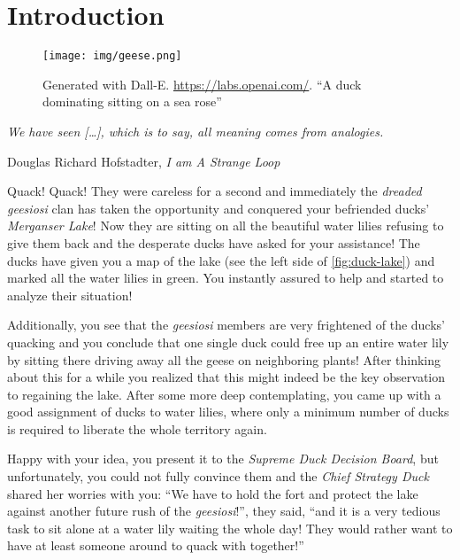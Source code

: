 \chapter{Introduction}\label{ch:introduction}

\vspace*{-50pt}

\begin{figure}[ht]
        \texttt{[image: img/geese.png]}
        \captionsetup{textformat=empty,labelformat=blank}
        \caption{Generated with Dall-E. \url{https://labs.openai.com/}. ``A duck dominating sitting on a sea rose''}
\end{figure}

\epigraph{\itshape We have seen [\ldots], which is to say, all meaning comes from analogies.}{Douglas Richard Hofstadter, \textit{I am A Strange Loop}}

Quack! Quack! They were careless for a second and immediately the \textit{dreaded geesiosi} clan has taken the opportunity and conquered your befriended ducks' \textit{Merganser Lake}!
Now they are sitting on all the beautiful water lilies refusing to give them back and the desperate ducks have asked for your assistance!
The ducks have given you a map of the lake (see the left side of \cref{fig:duck-lake}) and marked all the water lilies in green.
You instantly assured to help and started to analyze their situation!

Additionally, you see that the \textit{geesiosi} members are very frightened of the ducks' quacking and you conclude that one single duck could free up an entire water lily by sitting there driving away all the geese on neighboring plants! 
After thinking about this for a while you realized that this might indeed be the key observation to regaining the lake. 
After some more deep contemplating, you came up with a good assignment of ducks to water lilies, where only a minimum number of ducks is required to liberate the whole territory again.

Happy with your idea, you present it to the \textit{Supreme Duck Decision Board}, but unfortunately, you could not fully convince them and the \textit{Chief Strategy Duck} shared her worries with you: 
``We have to hold the fort and protect the lake against another future rush of the \textit{geesiosi}!'', they said, ``and it is a very tedious task  to sit alone at a water lily waiting the whole day! They would rather want to have at least someone around to quack with together!''

